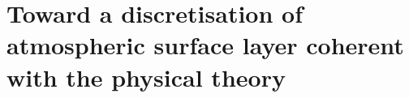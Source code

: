 \chapter{Toward a discretisation of atmospheric surface
layer coherent with the physical theory}
\label{ch:ND}
\minitoc




